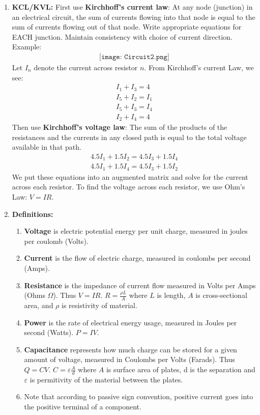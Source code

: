 \documentclass[10pt]{article}
\begin{document}
\begin{multicols}{2}
\begin{enumerate}
    \item \textbf{KCL/KVL:} First use \textbf{Kirchhoff's current law}: At any node (junction) in an electrical circuit, the sum of currents flowing into that node is equal to the sum of currents flowing out of that node. Write appropriate equations for EACH junction. Maintain consistency with choice of current direction. \\
    Example:
    \begin{align*}
        \texttt{[image: Circuit2.png]}
     \end{align*}
     Let $I_n$ denote the current across resistor $n$. From Kirchhoff's current Law, we see:
     \begin{align*}
         I_1 + I_3 = 4 \\
         I_5 + I_2 = I_1 \\
         I_5 + I_3 = I_4 \\
         I_2 + I_4 = 4 
     \end{align*}
     Then use \textbf{Kirchhoff's voltage law}: The sum of the products of the resistances and the currents in any closed path is equal to the total voltage available in that path.
     \begin{align*}
         4.5I_1 + 1.5I_2 = 4.5I_3 + 1.5I_4 \\
         4.5I_1 + 1.5I_4 = 4.5I_3 + 1.5I_2
     \end{align*}
     We put these equations into an augmented matrix and solve for the current across each resistor. To find the voltage across each resistor, we use Ohm's Law: $V=IR$.
    
    \item \textbf{Definitions:}
    \begin{enumerate}
        \item \textbf{Voltage} is electric potential energy per unit charge, measured in joules per coulomb (Volts).
        \item \textbf{Current} is the flow of electric charge, measured in coulombs per second (Amps).
        \item \textbf{Resistance} is the impedance of current flow measured in Volts per Amps (Ohms $\Omega$). Thus $V=IR$. $R = \frac{\rho L}{A}$ where $L$ is length, $A$ is cross-sectional area, and $\rho$ is resistivity of material.
        \item \textbf{Power} is the rate of electrical energy usage, measured in Joules per second (Watts). $P=IV$.
        \item \textbf{Capacitance} represents how much charge can be stored for a given amount of voltage, measured in Coulombs per Volts (Farads). Thus $Q=CV$. $C= \varepsilon \frac{A}{d}$ where $A$ is surface area of plates, d is the separation and $\varepsilon$ is permitivity of the material between the plates.
        \item Note that according to passive sign convention, positive current goes into the positive terminal of a component.
    \end{enumerate}


\end{enumerate}
\end{multicols}
\end{document}

